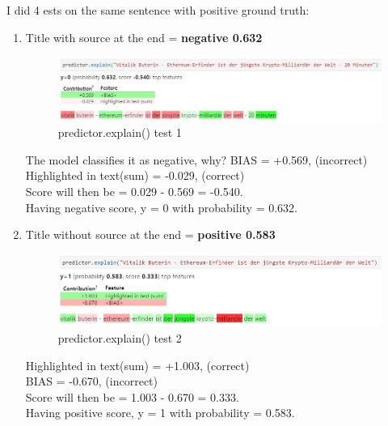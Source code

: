 I did 4 ests on the same sentence with positive ground truth:
\begin{enumerate}
  \item Title with source at the end = \textbf{negative 0.632}
  \begin{figure}[H]
\centering
\includegraphics[width=1\textwidth]{images/1text.jpg}
\caption{predictor.explain() test 1}
\label{fig:fig_001}
\end{figure}
\FloatBarrier
The model classifies it as negative, why?
BIAS = +0.569, (incorrect)\\
Highlighted in text(sum) = -0.029, (correct)\\
Score will then be = 0.029 - 0.569 = -0.540.\\
Having negative score, y = 0 with probability = 0.632.

  \item Title without source at the end = \textbf{positive 0.583}
    \begin{figure}[H]
\centering
\includegraphics[width=1\textwidth]{images/3text.jpg}
\caption{predictor.explain() test 2}
\label{fig:fig_002}
\end{figure}
\FloatBarrier
Highlighted in text(sum) = +1.003, (correct)\\
BIAS = -0.670, (incorrect)\\
Score will then be = 1.003 - 0.670 = 0.333.\\
Having positive score, y = 1 with probability = 0.583.


\end{enumerate}

